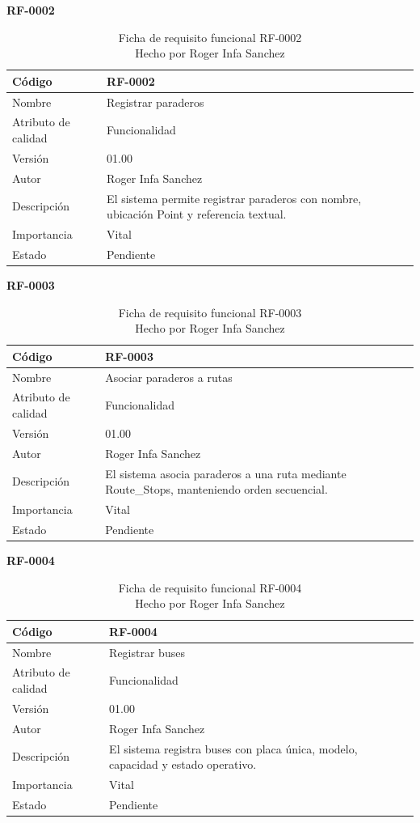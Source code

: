 \textbf{RF-0002}
\begin{longtable}{|p{}|p{}|}
\caption{Ficha de requisito funcional RF-0002\\Hecho por Roger Infa Sanchez} \\
\hline
Código & RF-0002 \\
\hline
Nombre & Registrar paraderos \\
\hline
Atributo de calidad & Funcionalidad \\
\hline
Versión & 01.00 \\
\hline
Autor & Roger Infa Sanchez \\
\hline
Descripción & El sistema permite registrar paraderos con nombre, ubicación Point y referencia textual. \\
\hline
Importancia & Vital \\
\hline
Estado & Pendiente \\
\hline
\end{longtable}

\textbf{RF-0003}
\begin{longtable}{|p{}|p{}|}
\caption{Ficha de requisito funcional RF-0003\\Hecho por Roger Infa Sanchez} \\
\hline
Código & RF-0003 \\
\hline
Nombre & Asociar paraderos a rutas \\
\hline
Atributo de calidad & Funcionalidad \\
\hline
Versión & 01.00 \\
\hline
Autor & Roger Infa Sanchez \\
\hline
Descripción & El sistema asocia paraderos a una ruta mediante Route\_Stops, manteniendo orden secuencial. \\
\hline
Importancia & Vital \\
\hline
Estado & Pendiente \\
\hline
\end{longtable}

\textbf{RF-0004}
\begin{longtable}{|p{}|p{}|}
\caption{Ficha de requisito funcional RF-0004\\Hecho por Roger Infa Sanchez} \\
\hline
Código & RF-0004 \\
\hline
Nombre & Registrar buses \\
\hline
Atributo de calidad & Funcionalidad \\
\hline
Versión & 01.00 \\
\hline
Autor & Roger Infa Sanchez \\
\hline
Descripción & El sistema registra buses con placa única, modelo, capacidad y estado operativo. \\
\hline
Importancia & Vital \\
\hline
Estado & Pendiente \\
\hline
\end{longtable}

